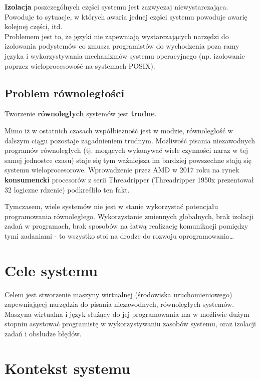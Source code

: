 \documentclass[11pt,oneside,a4paper,titlepage,onecolumn]{article}
\begin{document}
\textbf{Izolacja} poszczególnych części systemu jest zazwyczaj niewystarczająca. Powoduje to
sytuacje, w których awaria jednej części systemu powoduje awarię kolejnej części, itd. \\
Problemem jest to, że języki nie zapewniają wystarczających narzędzi do izolowania podystemów co
zmusza programistów do wychodzenia poza ramy języka i wykorzystywania mechanizmów systemu
operacyjnego (np. izolowanie poprzez wieloprocesowość na systemach POSIX).

\subsection{Problem równoległości}

\begin{center}
    Tworzenie \textbf{równoległych} systemów jest \textbf{trudne}.
\end{center}

Mimo iż w ostatnich czasach współbieżność jest w modzie, równoległość w dalszym ciągu pozostaje
zagadnieniem trudnym. Możliwość pisania niezawodnych programów równoległych (tj. mogących wykonywać
wiele czynności naraz w tej samej jednostce czasu) staje się tym ważniejsza im bardziej powszechne
stają się systemu wieloprocesorowe.
Wprowadzenie przez AMD w 2017 roku na rynek \textbf{konsumencki} procesorów z serii
Threadripper (Threadripper 1950x prezentował 32 logiczne rdzenie) podkreśliło ten fakt.

Tymczasem, wiele systemów nie jest w stanie wykorzystać potencjału programowania równoległego.
Wykorzystanie zmiennych globalnych, brak izolacji zadań w programach, brak sposobów na łatwą realizację
komunikacji pomiędzy tymi zadaniami - to wszystko stoi na drodze do rozwoju oprogramowania\ldots


\section{Cele systemu}

Celem jest stworzenie maszyny wirtualnej (środowiska uruchomieniowego) zapewniającej narzędzia do
pisania niezawodnych, równoległych systemów. Maszyna wirtualna i język służący do jej programowania
ma w możliwie dużym stopniu asystować programistę w wykorzystywaniu zasobów systemu, oraz
izolacji zadań i obsłudze błędów.

\section{Kontekst systemu}
\end{document}
